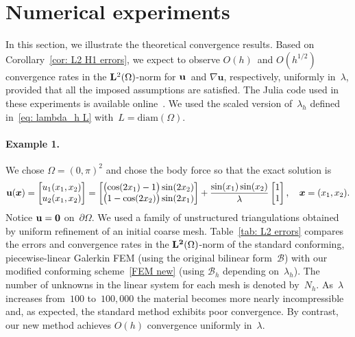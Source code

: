 \documentclass[11pt]{article}
\newcommand{\calB}{\mathcal{B}}
\newcommand{\vu}{{\bf u}}
\newcommand{\bsx}{{\boldsymbol{x}}}
\numberwithin{equation}{section}
\newcommand{\diam}{\mathrm{diam}}
\begin{document}
\section{Numerical experiments}\label{Sec: Numeric}
In this section, we illustrate the theoretical convergence results. Based on 
Corollary~\ref{cor: L2 H1 errors}, we expect to observe $O(h)$~and $O(h^{1/2})$
convergence rates in the ${\bf L}^2(\Omega)$-norm for ${\bf u}$~and
$\nabla\mathbf{u}$, respectively, uniformly in~$\lambda$, provided that all the
imposed assumptions are  satisfied.   The Julia code used in these experiments
is available online~\cite{McLean2024}.  We used the scaled version
of~$\lambda_h$ defined in~\eqref{eq: lambda_h L} with~$L=\diam(\Omega)$.

\paragraph{Example 1.} We chose  $\Omega=(0,\pi)^2$ and chose the body force so
that the exact solution is
\[
\vu(\boldsymbol{x})=\begin{bmatrix}  u_1(x_1,x_2)\\  u_2(x_1,x_2)\end{bmatrix}
=\begin{bmatrix}
\bigl(\cos(2x_1)-1\bigr)\sin(2x_2)\\ \bigl(1-\cos(2x_2)\bigr)\sin(2x_1)
\end{bmatrix}
+\frac{\sin(x_1)\sin(x_2)}{\lambda}\begin{bmatrix}1\\ 1\end{bmatrix},
\quad\bsx=(x_1,x_2).
\]
Notice $\vu=\mathbf{0}$ on~$\partial\Omega$.  We used a family of unstructured
triangulations obtained by uniform refinement of an initial coarse mesh.
Table~\ref{tab: L2 errors} compares the errors and convergence rates in the
${\bf L^2}(\Omega)$-norm of the standard conforming, piecewise-linear
Galerkin FEM (using the original bilinear form~$\calB$) with our modified
conforming scheme~\eqref{FEM new} (using $\calB_h$ depending on~$\lambda_h$).
The number of unknowns in the linear system for each mesh is denoted by~$N_h$.
As~$\lambda$ increases from~$100$ to~$100{,}000$ the material becomes more
nearly incompressible and, as expected, the standard method exhibits poor
convergence. By contrast, our new method achieves $O(h)$ convergence uniformly
in~$\lambda$.
   
\end{document}
